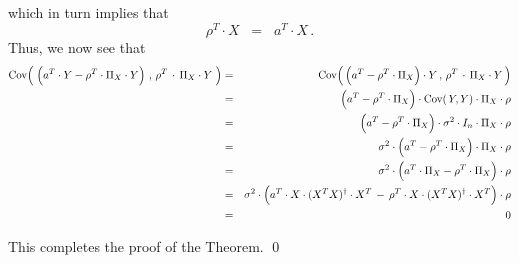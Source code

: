 \begin{enumerate}
	which in turn implies that
	\begin{equation*}
	\rho^{T} \cdot X
	\;\; = \;\;
		a^{T} \cdot X\,.
	\end{equation*}
	Thus, we now see that
	\begin{eqnarray*}
	\Cov\!\left(\;
		\left(a^{T} \cdot Y
		\overset{{\color{white}.}}{-}
		\rho^{T} \cdot \Pi_{X} \cdot Y\right)
		\,,\,
		\rho^{T} \overset{{\color{white}+}}{\cdot} \Pi_{X} \cdot Y
		\;\right)
	&=&
		\Cov\!\left(\,
			\left(a^{T} \overset{{\color{white}.}}{-} \rho^{T} \cdot \Pi_{X} \right) \cdot Y
			\,,\,
			\rho^{T} \overset{{\color{white}+}}{\cdot} \Pi_{X} \cdot Y
			\,\right)
	\\
	&=&
		\left(a^{T} \overset{{\color{white}.}}{-} \rho^{T} \cdot \Pi_{X} \right)
		\cdot \Cov\!\left(\,Y,Y\right) \cdot \Pi_{X} \cdot \rho
	\\
	&=&
		\left(a^{T} \overset{{\color{white}.}}{-} \rho^{T} \cdot \Pi_{X} \right)
		\cdot \sigma^{2} \cdot I_{n} \cdot \Pi_{X} \cdot \rho
	\\
	&=&
		\sigma^{2}
		\cdot
		\left(a^{T} \overset{{\color{white}.}}{-} \rho^{T} \cdot \Pi_{X} \right)
		\cdot \Pi_{X} \cdot \rho
	\\
	&=&
		\sigma^{2}
		\cdot
		\left(a^{T} \cdot \Pi_{X} \overset{{\color{white}.}}{-} \rho^{T} \cdot \Pi_{X} \right)
		\cdot \rho
	\\
	&=&
		\sigma^{2}
		\cdot
		\left(a^{T} \cdot X\cdot(X^{T}X)^{\dagger}\cdot X^{T}
		\,\overset{{\color{white}.}}{-}\,
		\rho^{T} \cdot X\cdot(X^{T}X)^{\dagger}\cdot X^{T} \right)
		\cdot \rho
	\\
	&=&
		0
	\end{eqnarray*}
\end{enumerate}
This completes the proof of the Theorem.
\qed


